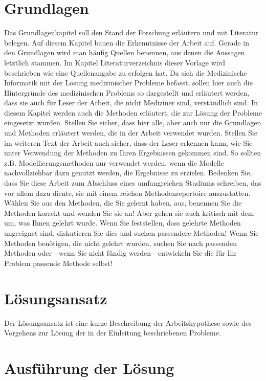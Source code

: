 \documentclass[headsepline,titlepage,twoside,12pt]{report}
\begin{document}
\chapter{Grundlagen}

Das Grundlagenkapitel soll den Stand der Forschung erläutern und mit Literatur belegen. Auf diesem Kapitel bauen die Erkenntnisse der Arbeit auf. Gerade in den Grundlagen wird man häufig Quellen benennen, aus denen die Aussagen letztlich stammen. Im Kapitel \glqq Literaturverzeichnis \grqq dieser Vorlage wird beschrieben wie eine Quellenangabe zu erfolgen hat.
Da sich die Medizinische Informatik mit der Lösung medizinischer Probleme befasst, sollen hier auch die Hintergründe des medizinischen Problems so dargestellt und erläutert werden, dass sie auch für Leser der Arbeit, die nicht Mediziner sind, verständlich sind.
In diesem Kapitel werden auch die Methoden erläutert, die zur Lösung der Probleme eingesetzt wurden. Stellen Sie sicher, dass hier alle, aber auch nur die Grundlagen und Methoden erläutert werden, die in der Arbeit verwendet wurden. Stellen Sie im weiteren Text der Arbeit auch sicher, dass der Leser erkennen kann, wie Sie unter Verwendung der Methoden zu Ihren Ergebnissen gekommen sind. So sollten z.B. Modellierungsmethoden nur verwendet werden, wenn die Modelle nachvollziehbar dazu genutzt werden, die Ergebnisse zu erzielen.
Bedenken Sie, dass Sie diese Arbeit zum Abschluss eines umfangreichen Studiums schreiben, das vor allem dazu diente, sie mit einem reichen Methodenrepertoire auszustatten. Wählen Sie aus den Methoden, die Sie gelernt haben, aus, benennen Sie die Methoden korrekt und wenden Sie sie an! Aber gehen sie auch kritisch mit dem um, was Ihnen gelehrt wurde. Wenn Sie feststellen, dass gelehrte Methoden ungeeignet sind, diskutieren Sie dies und suchen passendere Methoden! Wenn Sie Methoden benötigen, die nicht gelehrt wurden, suchen Sie nach passenden Methoden oder---wenn Sie nicht fündig werden---entwickeln Sie die für Ihr Problem passende Methode selbst!


\chapter{Lösungsansatz}

Der Lösungsansatz ist eine kurze Beschreibung der Arbeitshypothese sowie des Vorgehens zur Lösung der in der Einleitung beschriebenen Probleme.

\chapter{Ausführung der Lösung}
\end{document}
